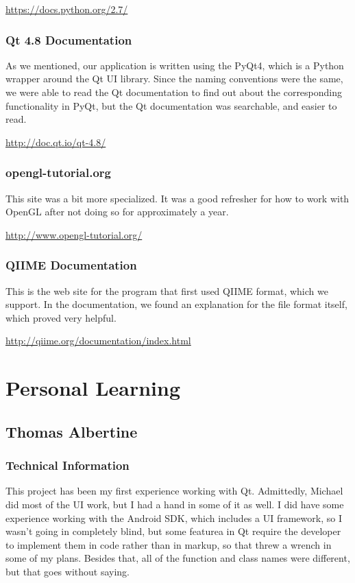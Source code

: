 \documentclass[letterpaper,10pt, onecolumn, draftclsnofoot]{IEEEtran}
\begin{document}
\url{https://docs.python.org/2.7/}

\subsubsection{Qt 4.8 Documentation}
As we mentioned, our application is written using the PyQt4, which is a Python wrapper around the Qt UI library. Since the naming conventions were the same, we were able to read the Qt documentation to find out about the corresponding functionality in PyQt, but the Qt documentation was searchable, and easier to read.

\url{http://doc.qt.io/qt-4.8/}

\subsubsection{opengl-tutorial.org}
This site was a bit more specialized. It was a good refresher for how to work with OpenGL after not doing so for approximately a year. 

\url{http://www.opengl-tutorial.org/}

\subsubsection{QIIME Documentation}
This is the web site for the program that first used QIIME format, which we support. In the documentation, we found an explanation for the file format itself, which proved very helpful.

\url{http://qiime.org/documentation/index.html}

\section{Personal Learning}
\subsection{Thomas Albertine}
\subsubsection{Technical Information}
This project has been my first experience working with Qt. Admittedly, Michael did most of the UI work, but I had a hand in some of it as well. I did have some experience working with the Android SDK, which includes a UI framework, so I wasn't going in completely blind, but some featurea in Qt require the developer to implement them in code rather than in markup, so that threw a wrench in some of my plans. Besides that, all of the function and class names were different, but that goes without saying.
\end{document}
